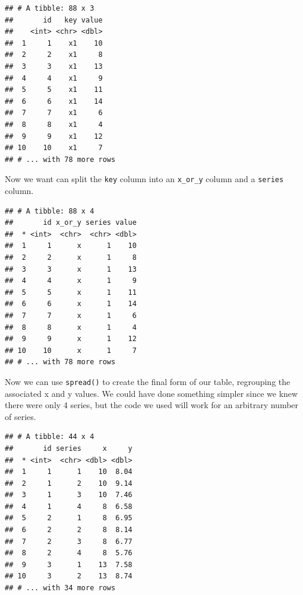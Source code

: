 \documentclass[]{book}
\newenvironment{Shaded}{\begin{snugshade}}{\end{snugshade}}
\newcommand{\KeywordTok}[1]{\textcolor[rgb]{0.13,0.29,0.53}{\textbf{{#1}}}}
\newcommand{\DecValTok}[1]{\textcolor[rgb]{0.00,0.00,0.81}{{#1}}}
\newcommand{\StringTok}[1]{\textcolor[rgb]{0.31,0.60,0.02}{{#1}}}
\newcommand{\NormalTok}[1]{{#1}}
\theoremstyle{definition}
\theoremstyle{definition}
\theoremstyle{remark}
\begin{document}
\begin{verbatim}
## # A tibble: 88 x 3
##       id   key value
##    <int> <chr> <dbl>
##  1     1    x1    10
##  2     2    x1     8
##  3     3    x1    13
##  4     4    x1     9
##  5     5    x1    11
##  6     6    x1    14
##  7     7    x1     6
##  8     8    x1     4
##  9     9    x1    12
## 10    10    x1     7
## # ... with 78 more rows
\end{verbatim}

Now we want can split the \texttt{key} column into an \texttt{x\_or\_y}
column and a \texttt{series} column.

\begin{Shaded}
\end{Shaded}

\begin{verbatim}
## # A tibble: 88 x 4
##       id x_or_y series value
##  * <int>  <chr>  <chr> <dbl>
##  1     1      x      1    10
##  2     2      x      1     8
##  3     3      x      1    13
##  4     4      x      1     9
##  5     5      x      1    11
##  6     6      x      1    14
##  7     7      x      1     6
##  8     8      x      1     4
##  9     9      x      1    12
## 10    10      x      1     7
## # ... with 78 more rows
\end{verbatim}

Now we can use \texttt{spread()} to create the final form of our table,
regrouping the associated x and y values. We could have done something
simpler since we knew there were only 4 series, but the code we used
will work for an arbitrary number of series.

\begin{Shaded}
\end{Shaded}

\begin{verbatim}
## # A tibble: 44 x 4
##       id series     x     y
##  * <int>  <chr> <dbl> <dbl>
##  1     1      1    10  8.04
##  2     1      2    10  9.14
##  3     1      3    10  7.46
##  4     1      4     8  6.58
##  5     2      1     8  6.95
##  6     2      2     8  8.14
##  7     2      3     8  6.77
##  8     2      4     8  5.76
##  9     3      1    13  7.58
## 10     3      2    13  8.74
## # ... with 34 more rows
\end{verbatim}
\end{document}
